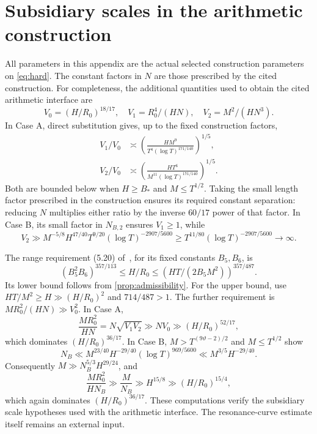 \documentclass[11pt,reqno]{amsart}
\numberwithin{equation}{section}
\theoremstyle{definition}
\theoremstyle{remark}
\newcommand{\vth}{\vartheta}
\begin{document}
\section{Subsidiary scales in the arithmetic construction}\label{app:construction}
All parameters in this appendix are the actual selected construction parameters on \eqref{eq:hard}. The constant factors in $N$ are those prescribed by the cited construction.
For completeness, the additional quantities used to obtain the cited arithmetic interface are
\[
 V_0=(H/R_0)^{18/17},\quad V_1=R_0^4/(HN),\quad V_2=M^2/(HN^3).
\]
In Case A, direct substitution gives, up to the fixed construction factors,
\begin{align}
 V_1/V_0&\asymp
 \left(\frac{HM^9}{T^4(\log T)^{171/140}}\right)^{1/5},\\
 V_2/V_0&\asymp
 \left(\frac{HT^6}{M^{11}(\log T)^{171/140}}\right)^{1/5}.
\end{align}
Both are bounded below when $H\ge B_*$ and $M\le T^{1/2}$. Taking the small length factor prescribed in the construction ensures its required constant separation: reducing $N$ multiplies either ratio by the inverse $60/17$ power of that factor.
In Case B, its small factor in $N_{B,2}$ ensures $V_1\ge1$, while
\[
 V_2\gg M^{-5/8}H^{47/40}T^{9/20}(\log T)^{-2907/5600}
 \ge T^{11/80}(\log T)^{-2907/5600}\to\infty.
\]

The range requirement (5.20) of~\cite{BW17}, for its fixed constants $B_5,B_6$, is
\[
 (B_5^2B_6)^{357/113}\le H/R_0
 \le\left(HT/(2B_5M^2)\right)^{357/487}.
\]
Its lower bound follows from \cref{prop:admissibility}. For the upper bound, use
$HT/M^2\ge H\gg(H/R_0)^2$ and $714/487>1$.
The further requirement is $MR_0^2/(HN)\gg V_0^2$.
In Case A,
\[
 \frac{MR_0^2}{HN}=N\sqrt{V_1V_2}
 \gg NV_0\gg (H/R_0)^{52/17},
\]
which dominates $(H/R_0)^{36/17}$.
In Case B, $M>T^{(9\vth-2)/2}$ and $M\le T^{1/2}$ show
\[
 N_B\ll M^{23/40}H^{-29/40}(\log T)^{969/5600}
 \ll M^{3/5}H^{-29/40}.
\]
Consequently $M\gg N_B^{5/3}H^{29/24}$, and
\[
 \frac{MR_0^2}{HN_B}\gg \frac M{N_B}
 \gg H^{15/8}\gg(H/R_0)^{15/4},
\]
which again dominates $(H/R_0)^{36/17}$.
These computations verify the subsidiary scale hypotheses used with the arithmetic interface. The resonance-curve estimate itself remains an external input.
\end{document}
